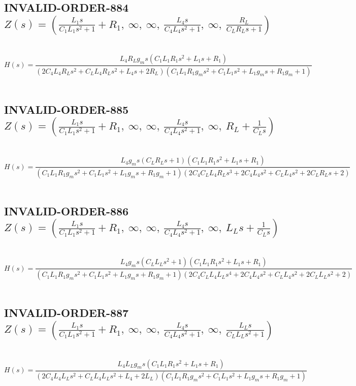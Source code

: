 \documentclass{article}
\begin{document}
\subsection{INVALID-ORDER-884 $Z(s) = \left( \frac{L_{1} s}{C_{1} L_{1} s^{2} + 1} + R_{1}, \  \infty, \  \infty, \  \frac{L_{4} s}{C_{4} L_{4} s^{2} + 1}, \  \infty, \  \frac{R_{L}}{C_{L} R_{L} s + 1}\right)$ } \ 
\textbf{\[H(s) = \frac{L_{4} R_{L} g_{m} s \left(C_{1} L_{1} R_{1} s^{2} + L_{1} s + R_{1}\right)}{\left(2 C_{4} L_{4} R_{L} s^{2} + C_{L} L_{4} R_{L} s^{2} + L_{4} s + 2 R_{L}\right) \left(C_{1} L_{1} R_{1} g_{m} s^{2} + C_{1} L_{1} s^{2} + L_{1} g_{m} s + R_{1} g_{m} + 1\right)}\] } \ 
\subsection{INVALID-ORDER-885 $Z(s) = \left( \frac{L_{1} s}{C_{1} L_{1} s^{2} + 1} + R_{1}, \  \infty, \  \infty, \  \frac{L_{4} s}{C_{4} L_{4} s^{2} + 1}, \  \infty, \  R_{L} + \frac{1}{C_{L} s}\right)$ } \ 
\textbf{\[H(s) = \frac{L_{4} g_{m} s \left(C_{L} R_{L} s + 1\right) \left(C_{1} L_{1} R_{1} s^{2} + L_{1} s + R_{1}\right)}{\left(C_{1} L_{1} R_{1} g_{m} s^{2} + C_{1} L_{1} s^{2} + L_{1} g_{m} s + R_{1} g_{m} + 1\right) \left(2 C_{4} C_{L} L_{4} R_{L} s^{3} + 2 C_{4} L_{4} s^{2} + C_{L} L_{4} s^{2} + 2 C_{L} R_{L} s + 2\right)}\] } \ 
\subsection{INVALID-ORDER-886 $Z(s) = \left( \frac{L_{1} s}{C_{1} L_{1} s^{2} + 1} + R_{1}, \  \infty, \  \infty, \  \frac{L_{4} s}{C_{4} L_{4} s^{2} + 1}, \  \infty, \  L_{L} s + \frac{1}{C_{L} s}\right)$ } \ 
\textbf{\[H(s) = \frac{L_{4} g_{m} s \left(C_{L} L_{L} s^{2} + 1\right) \left(C_{1} L_{1} R_{1} s^{2} + L_{1} s + R_{1}\right)}{\left(C_{1} L_{1} R_{1} g_{m} s^{2} + C_{1} L_{1} s^{2} + L_{1} g_{m} s + R_{1} g_{m} + 1\right) \left(2 C_{4} C_{L} L_{4} L_{L} s^{4} + 2 C_{4} L_{4} s^{2} + C_{L} L_{4} s^{2} + 2 C_{L} L_{L} s^{2} + 2\right)}\] } \ 
\subsection{INVALID-ORDER-887 $Z(s) = \left( \frac{L_{1} s}{C_{1} L_{1} s^{2} + 1} + R_{1}, \  \infty, \  \infty, \  \frac{L_{4} s}{C_{4} L_{4} s^{2} + 1}, \  \infty, \  \frac{L_{L} s}{C_{L} L_{L} s^{2} + 1}\right)$ } \ 
\textbf{\[H(s) = \frac{L_{4} L_{L} g_{m} s \left(C_{1} L_{1} R_{1} s^{2} + L_{1} s + R_{1}\right)}{\left(2 C_{4} L_{4} L_{L} s^{2} + C_{L} L_{4} L_{L} s^{2} + L_{4} + 2 L_{L}\right) \left(C_{1} L_{1} R_{1} g_{m} s^{2} + C_{1} L_{1} s^{2} + L_{1} g_{m} s + R_{1} g_{m} + 1\right)}\] } \ 
\end{document}
